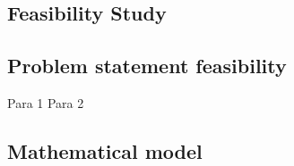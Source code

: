 \documentclass[oneside,a4paper,12pt, times]{book}
\begin{document}
\begin{appendices}

\chapter{Feasibility Study}
\section{Problem statement feasibility}
\-\hspace{0.5in}Para 1
\-\hspace{0.5in}Para 2

\section{Mathematical model}


\end{appendices}
\end{document}
